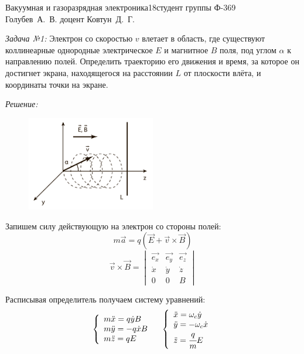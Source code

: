 




\usepackage{wrapfig}


{Вакуумная и газоразрядная электроника}{}{18}{студент группы Ф-369\\Голубев~А.~В.}
{}{доцент Ковтун~Д.~Г.}{}{}

\emph{Задача №1:} Электрон со скоростью \( v \) влетает в область, где 
существуют коллинеарные однородные электрическое \( E \) и магнитное \( B \) 
поля, под углом \( \alpha \) к направлению полей. Определить траекторию 
его движения и время, за которое он достигнет экрана, находящегося на 
расстоянии \( L \) от плоскости влёта, и координаты точки на экране.

\emph{Решение:}

\begin{figure}
    \vspace{-2ex}
    \includegraphics[width=0.5\textwidth]{images/im_01}
\end{figure}

Запишем силу действующую на электрон со стороны полей:
\[
	m\vec{a} = q\left( \vec{E} + \vec{v}\times\vec{B} \right)
\]
\[
	\vec{v}\times\vec{B} = 
	\begin{vmatrix}
		\vec{e_x} & \vec{e_y} & \vec{e_z} \\
		\dot{x}   & \dot{y}   & \dot{z}   \\
		0         & 0         & B
	\end{vmatrix}
\]

Расписывая определитель получаем систему уравнений:
\[
	\left\{ \begin{array}{ll}
		m\ddot{x} = q\dot{y}B \\
		m\ddot{y} = -q\dot{x}B \\
		m\ddot{z} = qE
	\end{array} \right.
	\quad
	\left\{ \begin{array}{ll}
		\ddot{x} = \omega_c\dot{y} \\
		\ddot{y} = -\omega_c\dot{x} \\
		\ddot{z} = \cfrac{q}{m}E
	\end{array} \right.
\]

